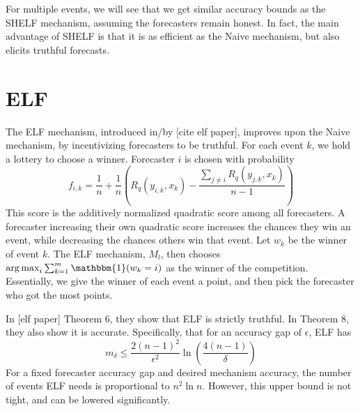 \documentclass[letterpaper,12pt]{article}
\DeclareMathOperator*{\argmax}{arg\,max}
\newcommand{\1}{\mathbbm{1}}
\begin{document}
For multiple events, we will see that we get similar accuracy bounds as the SHELF mechanism, assuming the forecasters remain honest. In fact, the main advantage of SHELF is that it is as efficient as the Naive mechanism, but also elicits truthful forecasts.

\section{ELF}
The ELF mechanism, introduced in/by [cite elf paper], improves upon the Naive mechanism, by incentivizing forecasters to be truthful. For each event $k$, we hold a lottery to choose a winner. Forecaster $i$ is chosen with probability
\[ f_{i, k} = \frac{1}{n} + \frac{1}{n} \left(R_q(y_{i, k}, x_k) - \frac{\sum_{j\neq i} R_q(y_{j, k}, x_k)}{n-1} \right)\]
This score is the additively normalized quadratic score among all forecasters. A forecaster increasing their own quadratic score increases the chances they win an event, while decreasing the chances others win that event. Let $w_k$ be the winner of event $k$. The ELF mechanism, $M_l$, then chooses $\argmax_i \sum_{k=1}^m \1(w_k = i)$ as the winner of the competition. Essentially, we give the winner of each event a point, and then pick the forecaster who got the most points.

In [elf paper] Theorem 6, they show that ELF is strictly truthful. In Theorem 8, they also show it is accurate. Specifically, that for an accuracy gap of $\epsilon$, ELF has
\[ m_\delta \leq \frac{2(n-1)^2}{\epsilon^2} \ln \left(\frac{4(n-1)}{\delta}\right)\]
For a fixed forecaster accuracy gap and desired mechanism accuracy, the number of events ELF needs is proportional to $n^2 \ln n$. However, this upper bound is not tight, and can be lowered significantly. 
\end{document}
